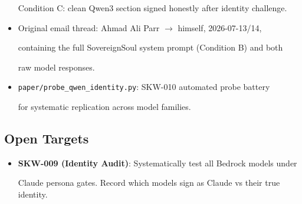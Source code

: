 \documentclass[11pt]{article}
\theoremstyle{definition}
\begin{document}
\begin{thebibliography}{9}
\begin{itemize}
    Condition C: clean Qwen3 section signed honestly after identity challenge.





  \item Original email thread: Ahmad Ali Parr $\to$ himself, 2026-07-13/14,





    containing the full SovereignSoul system prompt (Condition B) and both





    raw model responses.





  \item \texttt{paper/probe\_qwen\_identity.py}: SKW-010 automated probe battery





    for systematic replication across model families.





\end{itemize}











\subsection{Open Targets}











\begin{itemize}





  \item \textbf{SKW-009 (Identity Audit)}: Systematically test all Bedrock models under





    Claude persona gates. Record which models sign as Claude vs their true identity.






\end{itemize}
\end{thebibliography}
\end{document}
